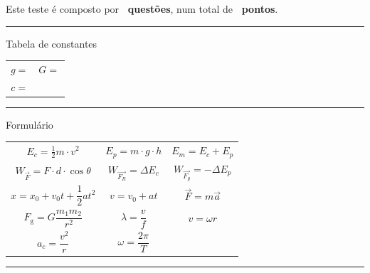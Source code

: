 \vspace{2cm}
Este teste é composto por \textbf{\numquestions\ questões}, num total de \textbf{\numpoints\ pontos}.

\par\noindent\rule{\textwidth}{0.4pt}

\vspace{10pt}
{\Large Tabela de constantes}

\begin{center}
	\begin{tabular}{c|c}
		
		$g = $ \kAccelGravity & $ G = $ \kGravity \\
		 $c = $ \kSpeedLight & \\
		
	\end{tabular}
\end{center}

\par\noindent\rule{\textwidth}{0.4pt}

\vspace{10pt}
{\Large Formulário}

\begin{center}
	\begin{tabular}{ccc}
		
		$E_c = \frac{1}{2} m \cdot v^2$ & $ E_p = m \cdot g \cdot h $ & $E_m = E_c + E_p$\\
		$W_{\vec{F}} = F \cdot d \cdot \cos \theta$ & $W_{\vec{F_R}} = \Delta E_c$ & $W_{\vec{F_g}} = - \Delta E_p$\\
		$x = x_0 + v_0 t + \dfrac{1}{2} a t^2$ & $v = v_0 + a t$ & $\vec{F} = m \vec{a}$\\
		$F_{\text{g}} = G \dfrac{m_1 m_2}{r^2}$ & $\lambda = \dfrac{v}{f}$& $v=\omega r$\\
		$a_c = \dfrac{v^2}{r}$ & $\omega = \dfrac{2\pi}{T}$ &\\
		
	\end{tabular}
\end{center}

\par\noindent\rule{\textwidth}{0.4pt}